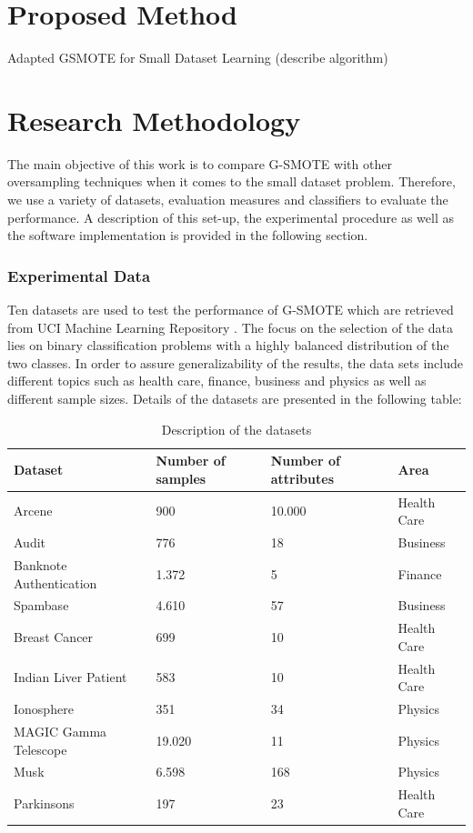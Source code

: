 \documentclass[parskip=full]{scrartcl}
\begin{document}
\section{Proposed Method}

Adapted GSMOTE for Small Dataset Learning (describe algorithm)

\section{Research Methodology}

The main objective of this work is to compare G-SMOTE with other oversampling techniques when it comes to the small dataset problem. Therefore, we use a variety of datasets, evaluation measures and classifiers to evaluate the performance. A description of this set-up, the experimental procedure as well as the software implementation is provided in the following section.

\subsubsection{Experimental Data}

Ten datasets are used to test the performance of G-SMOTE which are retrieved from UCI Machine Learning Repository \cite{Dua.2019}. The focus on the selection of the data lies on binary classification problems with a highly balanced distribution of the two classes. In order to assure generalizability of the results, the data sets include different topics such as health care, finance, business and physics as well as different sample sizes. Details of the datasets are presented in the following table:

\begin{table}[H]
	\centering
	\begin{tabular}{|l|l|l|l|}
		\hline
		\textbf{Dataset} & \textbf{Number of samples} & \textbf{Number of attributes} & \textbf{Area} \\
		\hline
		Arcene & 900 & 10.000 & Health Care \\
		\hline
		Audit & 776 & 18 & Business \\
		\hline
		Banknote Authentication & 1.372 & 5 & Finance \\
		\hline
		Spambase & 4.610 & 57 & Business\\
		\hline
		Breast Cancer & 699 & 10 & Health Care\\
		\hline
		Indian Liver Patient & 583 & 10 & Health Care\\
		\hline
		Ionosphere & 351 & 34 & Physics\\
		\hline
		MAGIC Gamma Telescope & 19.020 & 11 & Physics\\
		\hline
		Musk & 6.598 & 168 & Physics\\
		\hline
		Parkinsons & 197 & 23 & Health Care\\
		\hline
	\end{tabular}
\caption{\label{tab:datasets}Description of the datasets}
\end{table}
\end{document}
